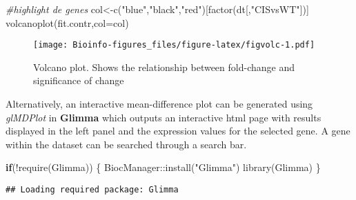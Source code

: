 \documentclass[
  openany]{book}
\newenvironment{Shaded}{\begin{snugshade}}{\end{snugshade}}
\newcommand{\AttributeTok}[1]{\textcolor[rgb]{0.77,0.63,0.00}{#1}}
\newcommand{\CommentTok}[1]{\textcolor[rgb]{0.56,0.35,0.01}{\textit{#1}}}
\newcommand{\ControlFlowTok}[1]{\textcolor[rgb]{0.13,0.29,0.53}{\textbf{#1}}}
\newcommand{\DecValTok}[1]{\textcolor[rgb]{0.00,0.00,0.81}{#1}}
\newcommand{\FunctionTok}[1]{\textcolor[rgb]{0.00,0.00,0.00}{#1}}
\newcommand{\NormalTok}[1]{#1}
\newcommand{\OtherTok}[1]{\textcolor[rgb]{0.56,0.35,0.01}{#1}}
\newcommand{\SpecialCharTok}[1]{\textcolor[rgb]{0.00,0.00,0.00}{#1}}
\newcommand{\StringTok}[1]{\textcolor[rgb]{0.31,0.60,0.02}{#1}}
\begin{document}
\begin{Shaded}
\begin{Highlighting}[]
\CommentTok{\#highlight de genes}
\NormalTok{col}\OtherTok{\textless{}{-}}\FunctionTok{c}\NormalTok{(}\StringTok{"blue"}\NormalTok{,}\StringTok{"black"}\NormalTok{,}\StringTok{"red"}\NormalTok{)[}\FunctionTok{factor}\NormalTok{(dt[,}\StringTok{"CISvsWT"}\NormalTok{])]}
\FunctionTok{volcanoplot}\NormalTok{(fit.contr,}\AttributeTok{col=}\NormalTok{col)}
\end{Highlighting}
\end{Shaded}

\begin{figure}
\centering
\texttt{[image: Bioinfo-figures\_files/figure-latex/figvolc-1.pdf]}
\caption{\label{fig:figvolc}Volcano plot. Shows the relationship between fold-change and significance of change}
\end{figure}

Alternatively, an interactive mean-difference plot can be generated using \emph{glMDPlot} in \textbf{Glimma} which outputs an interactive html page with results displayed in the left panel and the expression values for the selected gene. A gene within the dataset can be searched through a search bar.

\begin{Shaded}
\begin{Highlighting}[]
\ControlFlowTok{if}\NormalTok{(}\SpecialCharTok{!}\FunctionTok{require}\NormalTok{(Glimma))}
\NormalTok{\{}
\NormalTok{  BiocManager}\SpecialCharTok{::}\FunctionTok{install}\NormalTok{(}\StringTok{"Glimma"}\NormalTok{)}
  \FunctionTok{library}\NormalTok{(Glimma)}
\NormalTok{\}}
\end{Highlighting}
\end{Shaded}

\begin{verbatim}
## Loading required package: Glimma
\end{verbatim}

\begin{Shaded}
\end{Shaded}
\end{document}
